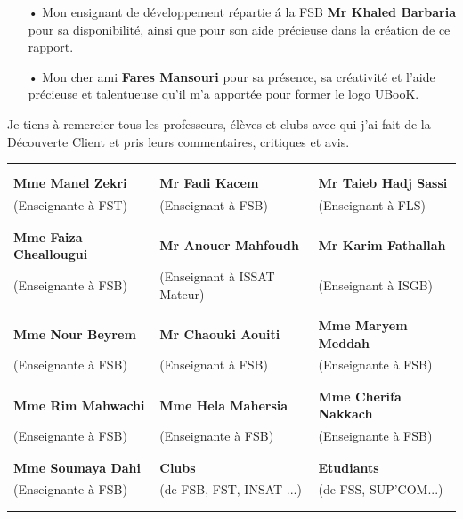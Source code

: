 \documentclass[12pt]{report}
\begin{document}
\begin{center}
\vspace*{1cm}
\begin{itemize}
\item[•] Mon ensignant de développement répartie á la FSB \textbf{Mr Khaled Barbaria} pour
sa disponibilité, ainsi que pour son aide précieuse dans la création de ce rapport.
\end{itemize}

\newpage
\vspace*{1cm}
\begin{itemize}
\item[•] Mon cher ami \textbf{Fares Mansouri} pour sa présence, sa créativité et l'aide précieuse et talentueuse qu'il m'a apportée pour former le logo UBooK.
\end{itemize}
\vspace*{1cm}
\large{
Je tiens à remercier tous les professeurs, élèves et clubs avec qui j'ai fait de la Découverte Client et pris leurs commentaires, critiques et avis.
\begin{table}[h!]
\begin{center}
\begin{tabular}{ p{5cm}  p{5cm}  p{5cm}}
&&\\
&&\\
\textbf{Mme Manel Zekri} & \textbf{Mr Fadi Kacem} & \textbf{Mr Taieb Hadj Sassi}\\
(Enseignante à FST) & (Enseignant à FSB) & (Enseignant à FLS)\\ 
&&\\
&&\\
\textbf{Mme Faiza Cheallougui} & \textbf{Mr Anouer Mahfoudh} & \textbf{Mr Karim Fathallah}\\
(Enseignante à FSB) & (Enseignant à ISSAT Mateur) & (Enseignant à ISGB)\\
&&\\
&&\\
\textbf{Mme Nour Beyrem} & \textbf{Mr Chaouki Aouiti} & \textbf{Mme Maryem Meddah}\\
(Enseignante à FSB) & (Enseignant à FSB) & (Enseignante à FSB)\\
&&\\
&&\\
\textbf{Mme Rim Mahwachi} & \textbf{Mme Hela Mahersia} & \textbf{Mme Cherifa Nakkach}\\
(Enseignante à FSB) & (Enseignante à FSB) & (Enseignante à FSB) \\
&&\\
&&\\
\textbf{Mme Soumaya Dahi} &  \textbf{Clubs} & \textbf{Etudiants} \\
(Enseignante à FSB) & (de FSB, FST, INSAT ...) & (de FSS, SUP'COM...)\\
&&\\
&&\\
\end{tabular}
\end{center}
\end{table}

}
\end{center}
\end{document}
